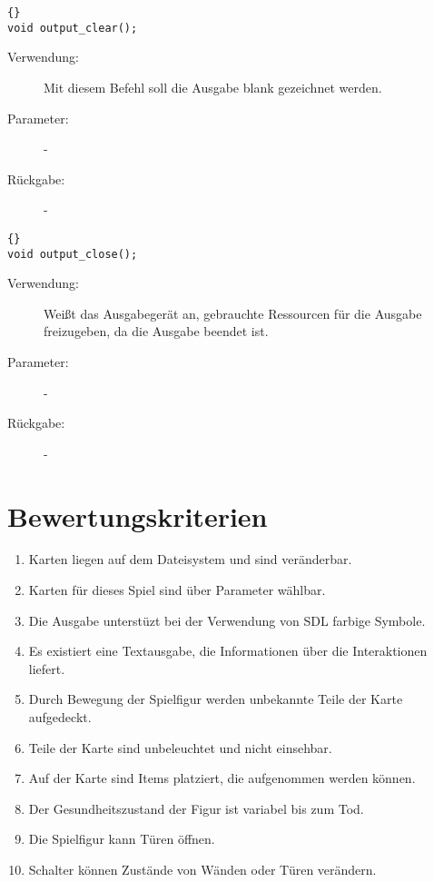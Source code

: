 \documentclass[11pt,a4paper,notitlepage]{report}
\begin{document}
		\begin{lstlisting}[caption=output\_clear]{}
void output_clear();
		\end{lstlisting}
		
	\begin{description}
		\item[Verwendung:] Mit diesem Befehl soll die Ausgabe blank gezeichnet werden.
		\item[Parameter:] -
		\item[Rückgabe:] -
	\end{description}
	
		\begin{lstlisting}[caption=output\_close]{}
void output_close();
		\end{lstlisting}
		
	\begin{description}
		\item[Verwendung:] Weißt das Ausgabegerät an, gebrauchte Ressourcen für die Ausgabe freizugeben, da die Ausgabe beendet ist.
		\item[Parameter:] -
		\item[Rückgabe:] -
	\end{description}

		
	\newpage
	\section*{Bewertungskriterien}
	\begin{enumerate}
	  \item Karten liegen auf dem Dateisystem und sind veränderbar.
		\item Karten für dieses Spiel sind über Parameter wählbar.
		\item Die Ausgabe unterstüzt bei der Verwendung von SDL farbige Symbole.
		\item Es existiert eine Textausgabe, die Informationen über die Interaktionen liefert.
		\item Durch Bewegung der Spielfigur werden unbekannte Teile der Karte aufgedeckt.
		\item Teile der Karte sind unbeleuchtet und nicht einsehbar.
		\item Auf der Karte sind Items platziert, die aufgenommen werden können.
		\item Der Gesundheitszustand der Figur ist variabel bis zum Tod.
		\item Die Spielfigur kann Türen öffnen.
		\item Schalter können Zustände von Wänden oder Türen verändern.
	\end{enumerate}
	
\end{document}
